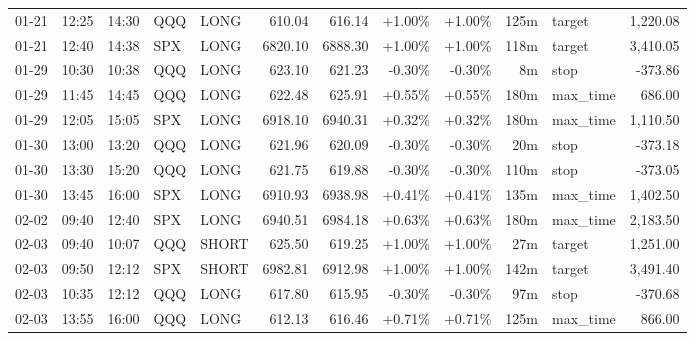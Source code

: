 \documentclass[11pt,a4paper,twoside]{article}
\begin{document}
\begin{center}
\begin{longtable}{>{\color{txtmain}}l l l l l r r r r r >{\color{txtmain}}l r}
01-21 & 12:25 & 14:30 & QQQ & LONG & 610.04 & 616.14 & \textcolor{wingreen}{+1.00\%} & \textcolor{wingreen}{+1.00\%} & 125m & target & \textcolor{wingreen}{1,220.08} \\
01-21 & 12:40 & 14:38 & SPX & LONG & 6820.10 & 6888.30 & \textcolor{wingreen}{+1.00\%} & \textcolor{wingreen}{+1.00\%} & 118m & target & \textcolor{wingreen}{3,410.05} \\
01-29 & 10:30 & 10:38 & QQQ & LONG & 623.10 & 621.23 & \textcolor{lossred}{-0.30\%} & \textcolor{lossred}{-0.30\%} & 8m & stop & \textcolor{lossred}{-373.86} \\
01-29 & 11:45 & 14:45 & QQQ & LONG & 622.48 & 625.91 & \textcolor{wingreen}{+0.55\%} & \textcolor{wingreen}{+0.55\%} & 180m & max\_time & \textcolor{wingreen}{686.00} \\
01-29 & 12:05 & 15:05 & SPX & LONG & 6918.10 & 6940.31 & \textcolor{wingreen}{+0.32\%} & \textcolor{wingreen}{+0.32\%} & 180m & max\_time & \textcolor{wingreen}{1,110.50} \\
01-30 & 13:00 & 13:20 & QQQ & LONG & 621.96 & 620.09 & \textcolor{lossred}{-0.30\%} & \textcolor{lossred}{-0.30\%} & 20m & stop & \textcolor{lossred}{-373.18} \\
01-30 & 13:30 & 15:20 & QQQ & LONG & 621.75 & 619.88 & \textcolor{lossred}{-0.30\%} & \textcolor{lossred}{-0.30\%} & 110m & stop & \textcolor{lossred}{-373.05} \\
01-30 & 13:45 & 16:00 & SPX & LONG & 6910.93 & 6938.98 & \textcolor{wingreen}{+0.41\%} & \textcolor{wingreen}{+0.41\%} & 135m & max\_time & \textcolor{wingreen}{1,402.50} \\
02-02 & 09:40 & 12:40 & SPX & LONG & 6940.51 & 6984.18 & \textcolor{wingreen}{+0.63\%} & \textcolor{wingreen}{+0.63\%} & 180m & max\_time & \textcolor{wingreen}{2,183.50} \\
02-03 & 09:40 & 10:07 & QQQ & SHORT & 625.50 & 619.25 & \textcolor{wingreen}{+1.00\%} & \textcolor{wingreen}{+1.00\%} & 27m & target & \textcolor{wingreen}{1,251.00} \\
02-03 & 09:50 & 12:12 & SPX & SHORT & 6982.81 & 6912.98 & \textcolor{wingreen}{+1.00\%} & \textcolor{wingreen}{+1.00\%} & 142m & target & \textcolor{wingreen}{3,491.40} \\
02-03 & 10:35 & 12:12 & QQQ & LONG & 617.80 & 615.95 & \textcolor{lossred}{-0.30\%} & \textcolor{lossred}{-0.30\%} & 97m & stop & \textcolor{lossred}{-370.68} \\
02-03 & 13:55 & 16:00 & QQQ & LONG & 612.13 & 616.46 & \textcolor{wingreen}{+0.71\%} & \textcolor{wingreen}{+0.71\%} & 125m & max\_time & \textcolor{wingreen}{866.00} \\

\end{longtable}
\end{center}
\end{document}
